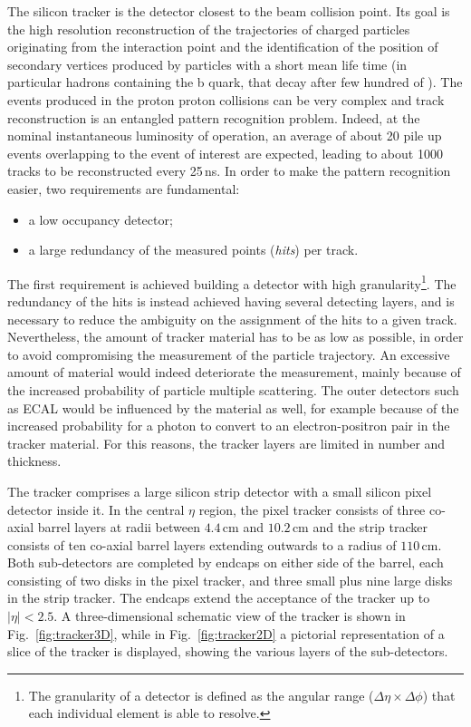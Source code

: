 The silicon tracker is the detector closest to the beam collision point. Its goal is the high resolution reconstruction of the trajectories of charged particles originating from the interaction point and the identification of the position of secondary vertices produced by particles with a short mean life time (in particular hadrons containing the b quark, that decay after few hundred of \micron). The events produced in the proton proton collisions can be very complex and track reconstruction is an entangled pattern recognition problem. Indeed, at the nominal instantaneous luminosity of operation, an average of about 20 pile up events overlapping to the event of interest are expected, leading to about 1000 tracks to be reconstructed every 25\,ns. In order to make the pattern recognition easier, two requirements are fundamental:
\begin{itemize}
\item a low occupancy detector;
\item a large redundancy of the measured points (\emph{hits}) per track.
\end{itemize}
The first requirement is achieved building a detector with high granularity\footnote{The granularity of a detector is defined as the angular range ($\Delta\eta\times\Delta\phi$) that each individual element is able to resolve.}. The redundancy of the hits is instead achieved having several detecting layers, and is necessary to reduce the ambiguity on the assignment of the hits to a given track. Nevertheless, the amount of tracker material has to be as low as possible, in order to avoid compromising the measurement of the particle trajectory. An excessive amount of material would indeed deteriorate the measurement, mainly because of the increased probability of particle multiple scattering. The outer detectors such as ECAL would be influenced by the material as well, for example because of the increased probability for a photon to convert to an electron-positron pair in the tracker material. For this reasons, the tracker layers are limited in number and thickness.

The tracker comprises a large silicon strip detector with a small silicon pixel detector inside it. In the central $\eta$ region, the pixel tracker consists of three co-axial barrel layers at radii between $4.4$\,cm and $10.2$\,cm and the strip tracker consists of ten co-axial barrel layers extending outwards to a radius of $110$\,cm. Both sub-detectors are completed by endcaps on either
side of the barrel, each consisting of two disks in the pixel tracker, and three small plus nine large disks in the strip tracker. The endcaps extend the acceptance of the tracker up to $|\eta|<2.5$. A three-dimensional schematic view of the tracker is shown in Fig.~\ref{fig:tracker3D}, while in Fig.~\ref{fig:tracker2D} a pictorial representation of a slice of the tracker is displayed, showing the various layers of the sub-detectors.

